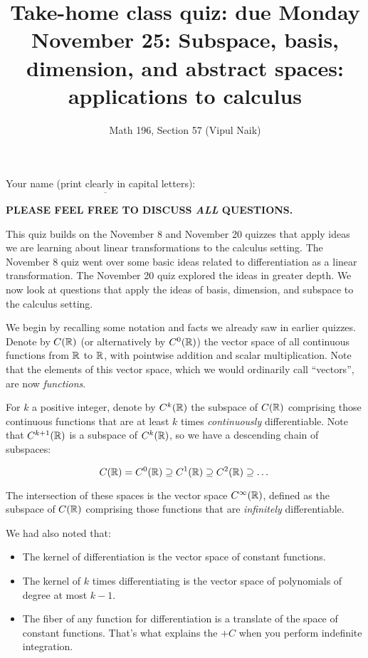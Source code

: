 \documentclass[10pt]{amsart}
\title{Take-home class quiz: due Monday November 25: Subspace, basis, dimension, and abstract spaces: applications to calculus}
\author{Math 196, Section 57 (Vipul Naik)}
\begin{document}
\maketitle

Your name (print clearly in capital letters): $\underline{\qquad\qquad\qquad\qquad\qquad\qquad\qquad\qquad\qquad\qquad}$

{\bf PLEASE FEEL FREE TO DISCUSS {\em ALL} QUESTIONS.}

This quiz builds on the November 8 and November 20 quizzes that apply
ideas we are learning about linear transformations to the calculus
setting. The November 8 quiz went over some basic ideas related to
differentiation as a linear transformation. The November 20 quiz
explored the ideas in greater depth. We now look at questions that
apply the ideas of basis, dimension, and subspace to the calculus
setting.

We begin by recalling some notation and facts we already saw in
earlier quizzes.  Denote by $C(\mathbb{R})$ (or alternatively by $C^0(\mathbb{R})$)
the vector space of all continuous functions from $\mathbb{R}$ to $\mathbb{R}$, with
pointwise addition and scalar multiplication. Note that the elements
of this vector space, which we would ordinarily call ``vectors'', are
now {\em functions}.

For $k$ a positive integer, denote by $C^k(\mathbb{R})$ the subspace of
$C(\mathbb{R})$ comprising those continuous functions that are at least $k$
times {\em continuously} differentiable. Note that $C^{k+1}(\mathbb{R})$ is
a subspace of $C^k(\mathbb{R})$, so we have a descending chain of subspaces:

$$C(\mathbb{R}) = C^0(\mathbb{R}) \supseteq C^1(\mathbb{R}) \supseteq C^2(\mathbb{R}) \supseteq \dots $$

The intersection of these spaces is the vector space $C^\infty(\mathbb{R})$,
defined as the subspace of $C(\mathbb{R})$ comprising those functions that
are {\em infinitely} differentiable.

We had also noted that:

\begin{itemize}
\item The kernel of differentiation is the vector space of constant functions.
\item The kernel of $k$ times differentiating is the vector space of
  polynomials of degree at most $k - 1$.
\item The fiber of any function for differentiation is a translate
  of the space of constant functions. That's what explains the $+C$
  when you perform indefinite integration.
\end{itemize}
\end{document}
